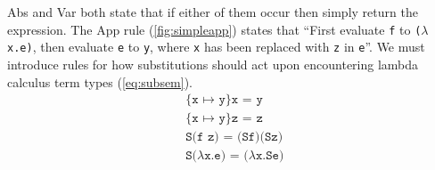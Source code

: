 \documentclass[11pt,oneside,a4paper]{report}
\begin{document}
Abs and Var both state that if either of them occur then simply return the expression.
The App rule (\autoref{fig:simpleapp}) states that ``First evaluate \texttt{f} to \texttt{($\lambda$x.e)}, then evaluate \texttt{e} to \texttt{y}, where \texttt{x} has been replaced with \texttt{z} in \texttt{e}''.
We must introduce rules for how substitutions should act upon encountering lambda calculus term types (\autoref{eq:subsem}).
\begin{align}
  &\texttt{\{x $\mapsto$ y\}x = y} \label{eq:subsem}\\
  &\texttt{\{x $\mapsto$ y\}z = z}  \tag*{}\\
  &\texttt{S(f z) = (Sf)(Sz)} \tag*{}\\
  &\texttt{S($\lambda$x.e) = ($\lambda$x.Se) } \label{eq:subsemrem}%
\end{align}
\end{document}
